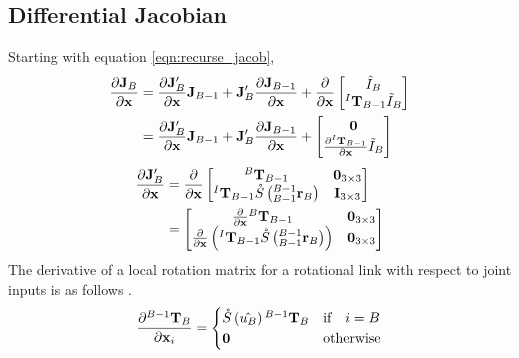 \subsection{Differential Jacobian}

\noindent Starting with equation \ref{eqn:recurse_jacob},
\begin{align} \nonumber
    \frac{\partial\mathbf{J}_B}{\partial{\mathbf{{x}}}} &= \frac{\partial \mathbf{J}_B'}{\partial{\mathbf{{x}}}}\mathbf{J}_{B-1} + \mathbf{J}_B' \frac{\partial\mathbf{J}_{B-1}}{\partial{\mathbf{{x}}}} + \frac{\partial}{\partial{\mathbf{{x}}}}\begin{bmatrix} 
			{\hat{I}_B} \\
			{{^I\mathbf{T}_{B-1}}\Tilde{I}_B} \\
			\end{bmatrix}  \\
			&= \frac{\partial \mathbf{J}_B'}{\partial{\mathbf{{x}}}}\mathbf{J}_{B-1} + \mathbf{J}_B' \frac{\partial\mathbf{J}_{B-1}}{\partial{\mathbf{{x}}}} + \begin{bmatrix} 
			{{\mathbf{0}}} \\
			{\frac{\partial^I\mathbf{T}_{B-1}}{\partial{\mathbf{{x}}}}\Tilde{I}_B} \\
			\end{bmatrix}  \label{eqn:d_jacob}
\end{align}
\begin{align} \label{eqn_d_jp}
    \frac{\partial \mathbf{J}_B'}{\partial {\mathbf{{x}}}} &=
    \frac{\partial}{\partial {\mathbf{{x}}}}\begin{bmatrix}
        {^B}\mathbf{T}_{B-1} & {\mathbf{0}}_{3 \times 3} \\
        {^I\mathbf{T}_{B-1}}\mathring{S}\left(^{B-1}_{B-1}\mathbf{r}_{B}\right) & {\mathbf{I}}_{3 \times 3}
    \end{bmatrix} \\
    &=
    \begin{bmatrix}
        \frac{\partial}{\partial {\mathbf{{x}}}}{^B}\mathbf{T}_{B-1} & {\mathbf{0}}_{3 \times 3} \\
       \frac{\partial}{\partial {\mathbf{{x}}}}\left ( {^I\mathbf{T}_{B-1}}\mathring{S}\left(^{B-1}_{B-1}\mathbf{r}_{B}\right) \right) & {\mathbf{0}}_{3 \times 3}
    \end{bmatrix} \nonumber
\end{align}
\noindent The derivative of a local rotation matrix for a rotational link with respect to joint inputs is as follows \Cite{woolfrey_2018}.
\begin{align} \label{eqn:rot_diff}
    \frac{\partial {^{B-1}\mathbf{T}_B}}{\partial {\mathbf{{x}}}_i} = \begin{cases}
    \mathring{S}\left(\hat{u_B}\right){^{B-1}\mathbf{T}_B} & \text{if} \quad i = B\\
    {\mathbf{0}} & \text{otherwise}\\
    \end{cases}
\end{align}
